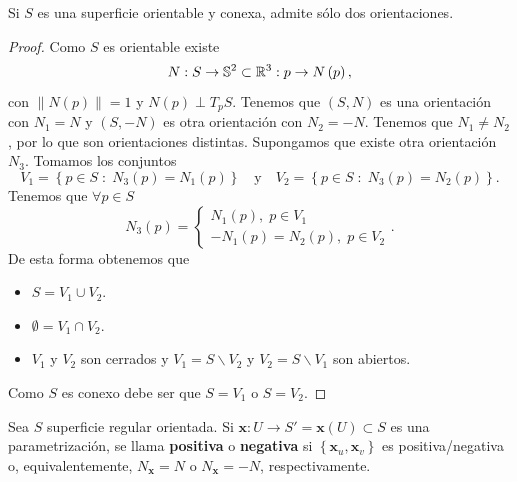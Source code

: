 \begin{prop}
Si $\displaystyle S $ es una superficie orientable y conexa, admite sólo dos orientaciones. 
\end{prop}
\begin{proof}
Como $\displaystyle S $ es orientable existe
\[N : S \to \mathbb{S}^{2}\subset \mathbb{R}^{3} : p \to N\left(p\right) ,\]
con $\displaystyle \|N\left(p\right)\| = 1 $ y $\displaystyle N\left(p\right)\perp T_{p}S $. Tenemos que $\displaystyle \left(S,N\right) $ es una orientación con $\displaystyle N_{1}=N $ y $\displaystyle \left(S, -N\right) $ es otra orientación con $\displaystyle N_{2}=-N $. Tenemos que $\displaystyle N_{1}\neq N_{2} $, por lo que son orientaciones distintas. 
Supongamos que existe otra orientación $\displaystyle N_{3} $. Tomamos los conjuntos 
\[V_{1} = \left\{ p \in S \; : \; N_{3}\left(p\right) = N_{1}\left(p\right)\right\} \quad \text{y} \quad V_{2} = \left\{ p \in S \; : \; N_{3}\left(p\right)=N_{2}\left(p\right)\right\}  .\]
Tenemos que $\displaystyle \forall p \in S $ 
\[
N_{3}\left(p\right)=
\begin{cases}
N_{1}\left(p\right) , \; p \in V_{1} \\
-N_{1}\left(p\right)=N_{2}\left(p\right), \; p \in V_{2}
\end{cases}
.\]
De esta forma obtenemos que 
\begin{itemize}
\item $\displaystyle S = V_{1} \cup V_{2} $.
\item  $\displaystyle \emptyset = V_{1} \cap V_{2} $.
\item $\displaystyle V_{1} $ y $\displaystyle V_{2} $ son cerrados y $\displaystyle V_{1}= S\backslash V_{2} $ y $\displaystyle V_{2}=S\backslash V_{1} $ son abiertos.
\end{itemize}
Como $\displaystyle S $ es conexo debe ser que $\displaystyle S = V_{1} $ o $\displaystyle S = V_{2} $. 
\end{proof}
\begin{definition}
Sea $\displaystyle S $ superficie regular orientada. 
	Si $\displaystyle \textbf{x} : U \to S' = \textbf{x} \left(U\right)\subset S $ es una parametrización, se llama \textbf{positiva} o \textbf{negativa} si $\displaystyle \left\{ \textbf{x} _{u}, \textbf{x} _{v}\right\}  $ es positiva/negativa o, equivalentemente, $\displaystyle N_{ \textbf{x} }=N $ o $\displaystyle N_{ \textbf{x} }=-N $, respectivamente.
\end{definition}

